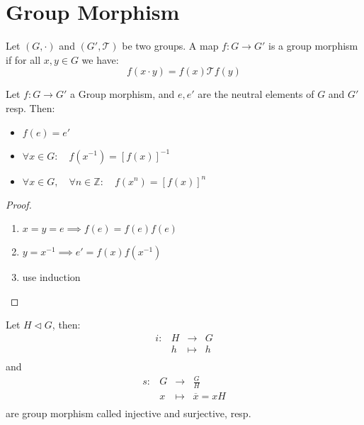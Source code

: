 \section{Group Morphism}
\begin{definition}[]
Let $(G, \cdot ) $ and $(G', \mathcal{T} )  $ be two groups. A map
$ f : G \longrightarrow G' $ is a group morphism if for all $x,y \in  G $ we have:
\[
f(x \cdot y) = f(x) \mathcal{T} f(y) 
\]
\end{definition}
\begin{proposition}[]
Let $ f : G \longrightarrow G' $ a Group morphism, and $e, e' $ are
the neutral elements of $G $ and $G' $ resp. Then:
\begin{itemize}
  \item[\ding{172}] $f(e)  = e' $ 
  \item[\ding{173}] $\forall x \in   G: \quad f(x^{-1}) = \left[ f(x)  \right]^{-1}  $ 
  \item[\ding{174}] $\forall x \in G, \quad \forall n \in  \mathbb{Z}: \quad 
    f(x^n ) = \left[ f(x)  \right]^n $ 
\end{itemize}
\end{proposition}
\begin{proof}
  \begin{enumerate}
    \item[\fbox{1}]
   $x = y = e \implies  f(e)  = f(e)  f(e) $ 
\item[\fbox{2}] 
      $y = x^{-1} \implies e' = f(x) f(x^{-1})  $ 
    \item[\fbox{3}]  use induction
  \end{enumerate}
\end{proof}
\begin{example}
Let $H \lhd G $, then: 
\[
\begin{array}{cccc}
      i : &  H  & \longrightarrow & G \\

           &  h  & \longmapsto     & h \\ 
\end{array}
\]
and \[
\begin{array}{cccc}
      s : &  G  & \longrightarrow & \frac{G}{H} \\

           &  x  & \longmapsto     & \overline{x} = 
           xH\\ 
\end{array}
\]
are group morphism called injective and surjective, resp.
\end{example}
